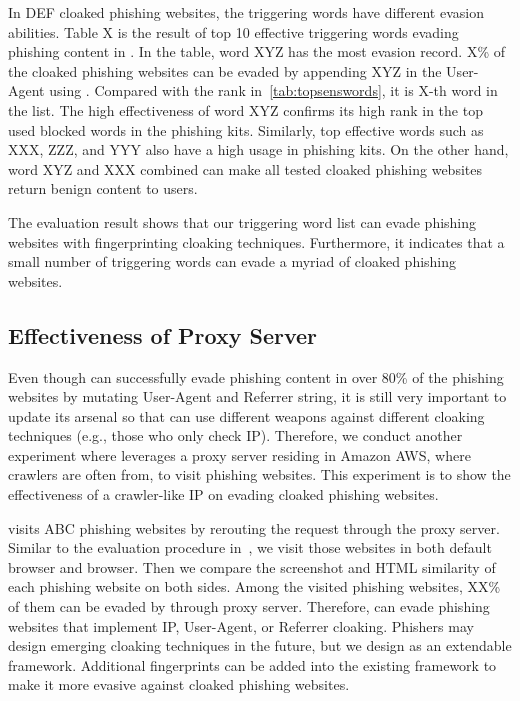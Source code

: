 In DEF cloaked phishing websites, the triggering words have different evasion abilities.
Table X is the result of top 10 effective triggering words evading phishing content in \spartacus.
In the table, word XYZ has the most evasion record.
X\% of the cloaked phishing websites can be evaded by appending XYZ in the User-Agent using \spartacus.
Compared with the rank in~\autoref{tab:topsenswords}, it is X-th word in the list.
The high effectiveness of word XYZ confirms its high rank in the top used blocked words in the phishing kits.
Similarly, top effective words such as XXX, ZZZ, and YYY also have a high usage in phishing kits.
On the other hand, word XYZ and XXX combined can make all tested cloaked phishing websites return benign content to users.

The evaluation result shows that our triggering word list can evade phishing websites with fingerprinting cloaking techniques.
Furthermore, it indicates that a small number of triggering words can evade a myriad of cloaked phishing websites.


\subsection{Effectiveness of Proxy Server}

Even though \spartacus can successfully evade phishing content in over 80\% of the phishing websites by mutating User-Agent and Referrer string, 
it is still very important to update its arsenal so that \spartacus can use different weapons against different cloaking techniques (e.g., those who only check IP). 
Therefore, we conduct another experiment where \spartacus leverages a proxy server residing in Amazon AWS, where crawlers are often from, to visit phishing websites.
This experiment is to show the effectiveness of a crawler-like IP on evading cloaked phishing websites.

\spartacus visits ABC phishing websites by rerouting the request through the proxy server.
Similar to the evaluation procedure in~,
we visit those websites in both default browser and \spartacus browser.
Then we compare the screenshot and HTML similarity of each phishing website on both sides.
Among the visited phishing websites, XX\% of them can be evaded by \spartacus through proxy server.
Therefore, \spartacus can evade phishing websites that implement IP, User-Agent, or Referrer cloaking.
Phishers may design emerging cloaking techniques in the future, but we design \spartacus as an extendable framework.
Additional fingerprints can be added into the existing framework to make it more evasive against cloaked phishing websites.


